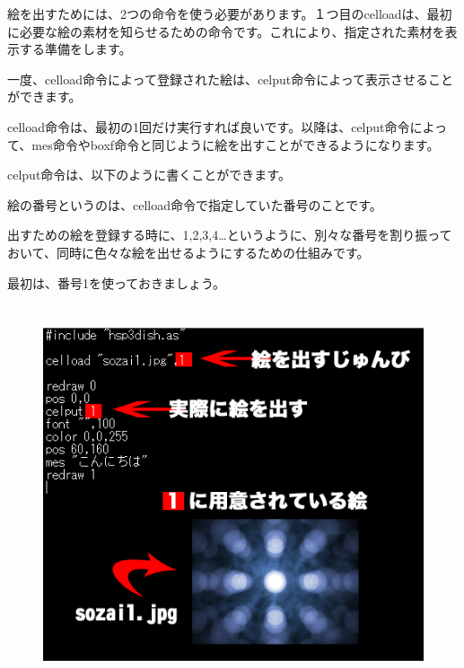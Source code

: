 絵を出すためには、2つの命令を使う必要があります。１つ目のcelloadは、最初に必要な絵の素材を知らせるための命令です。これにより、指定された素材を表示する準備をします。

\begin{description}
    \item {}
\end{description}


一度、celload命令によって登録された絵は、celput命令によって表示させることができます。

celload命令は、最初の1回だけ実行すれば良いです。以降は、celput命令によって、mes命令やboxf命令と同じように絵を出すことができるようになります。


celput命令は、以下のように書くことができます。




\begin{description}
    \item {}
\end{description}



絵の番号というのは、celload命令で指定していた番号のことです。

出すための絵を登録する時に、1,2,3,4…というように、別々な番号を割り振っておいて、同時に色々な絵を出せるようにするための仕組みです。

最初は、番号1を使っておきましょう。


\begin{figure}[H]
    \begin{center}
      \includegraphics[keepaspectratio,width=12.806cm,height=11.206cm]{text04-img/text04-img013.png}
    \end{center}
    \label{fig:prog_menu}
\end{figure}


